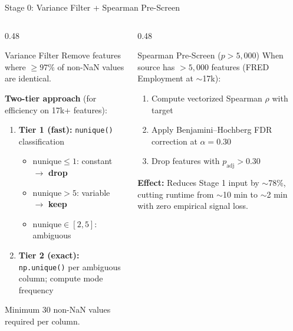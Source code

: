 \documentclass[aspectratio=169,10pt]{beamer}
\begin{document}
\begin{frame}[fragile]{Stage 0: Variance Filter + Spearman Pre-Screen}
\begin{columns}[T]
\begin{column}{0.48\textwidth}
\begin{block}{Variance Filter}
\footnotesize
Remove features where $\ge 97\%$ of non-NaN values are identical.

\textbf{Two-tier approach} (for efficiency on 17k+ features):
\begin{enumerate}
  \item \textbf{Tier 1 (fast):} \texttt{nunique()} classification
  \begin{itemize}\scriptsize
    \item $\text{nunique} \le 1$: constant $\to$ \textbf{drop}
    \item $\text{nunique} > 5$: variable $\to$ \textbf{keep}
    \item $\text{nunique} \in [2,5]$: ambiguous
  \end{itemize}
  \item \textbf{Tier 2 (exact):} \texttt{np.unique()} per ambiguous column; compute mode frequency
\end{enumerate}
Minimum 30 non-NaN values required per column.
\end{block}
\end{column}
\begin{column}{0.48\textwidth}
\begin{block}{Spearman Pre-Screen ($p > 5{,}000$)}
\footnotesize
When source has $> 5{,}000$ features (FRED Employment at $\sim$17k):

\begin{enumerate}
  \item Compute vectorized Spearman $\rho$ with target
  \item Apply Benjamini--Hochberg FDR correction at $\alpha = 0.30$
  \item Drop features with $p_{\text{adj}} > 0.30$
\end{enumerate}

\textbf{Effect:} Reduces Stage 1 input by $\sim$78\%, cutting runtime from $\sim$10 min to $\sim$2 min with zero empirical signal loss.
\end{block}
\end{column}
\end{columns}
\end{frame}
\end{document}
